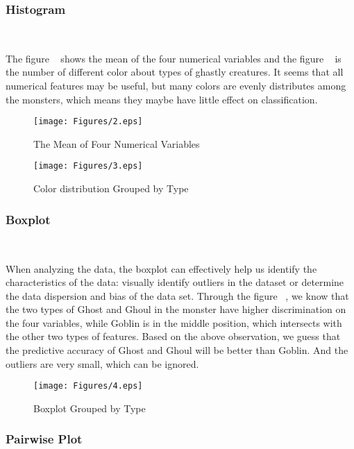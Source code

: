 \subsubsection{ Histogram}
\

The figure ~ 
shows the mean of the four numerical variables  
and the figure ~ 
is the number of different color 
about types of ghastly creatures.
It seems that all numerical features may be useful, 
but many colors are evenly distributes among the monsters,
which means they maybe have little effect on classification.


\begin{figure}[htbp]
	\centering
	
	\texttt{[image: Figures/2.eps]}
	\caption{The Mean of Four Numerical Variables}\label{fig:his_1}
\end{figure}

\begin{figure}[htbp]
	\centering
	
	\texttt{[image: Figures/3.eps]}
	\caption{Color distribution Grouped by Type}\label{fig:his_2}
\end{figure}

\subsubsection{Boxplot}
\
 
When analyzing the data, 
the boxplot can effectively 
help us identify the characteristics of the data:
visually identify outliers in the dataset or
determine the data dispersion and 
bias of the data set. 
Through the figure ~, 
we know that the two types of Ghost and Ghoul 
in the monster have higher discrimination 
on the four variables, 
while Goblin is in the middle position, 
which intersects with the other two types of features.
Based on the above observation,
we guess that the predictive accuracy of Ghost and Ghoul 
will be better than Goblin.
And the outliers are very small,
which can be ignored.


\begin{figure}[htbp]
	\centering
	\texttt{[image: Figures/4.eps]}
	\caption{Boxplot Grouped by Type}\label{fig:boxplot}
\end{figure}


\subsubsection{Pairwise Plot} 
\

